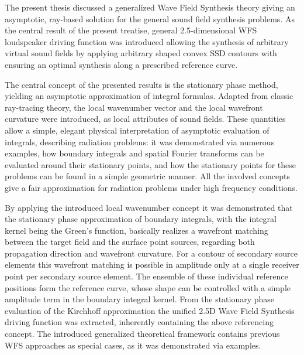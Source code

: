 The present thesis discussed a generalized Wave Field Synthesis theory giving an asymptotic, ray-based solution for the general sound field synthesis problems.
As the central result of the present treatise, general 2.5-dimensional WFS loudspeaker driving function was introduced allowing the synthesis of arbitrary virtual sound fields by applying arbitrary shaped convex SSD contours with ensuring an optimal synthesis along a prescribed reference curve.

The central concept of the presented results is the stationary phase method, yielding an asymptotic approximation of integral formulas.
Adapted from classic ray-tracing theory, the local wavenumber vector and the local wavefront curvature were introduced, as local attributes of sound fields.
These quantities allow a simple, elegant physical interpretation of asymptotic evaluation of integrals, describing radiation problems: it was demonstrated via numerous examples, how boundary integrals and spatial Fourier transforms can be evaluated around their stationary points, and how the stationary points for these problems can be found in a simple geometric manner.
All the involved concepts give a fair approximation for radiation problems under high frequency conditions.

By applying the introduced local wavenumber concept it was demonstrated that the stationary phase approximation of boundary integrals, with the integral kernel being the Green's function, basically realizes a wavefront matching between the target field and the surface point sources, regarding both propagation direction and wavefront curvature.
For a contour of secondary source elements this wavefront matching is possible in amplitude only at a single receiver point per secondary source element.
The ensemble of these individual reference positions form the reference curve, whose shape can be controlled with a simple amplitude term in the boundary integral kernel.
From the stationary phase evaluation of the Kirchhoff approximation the unified 2.5D Wave Field Synthesis driving function was extracted, inherently containing the above referencing concept.
The introduced generalized theoretical framework contains previous WFS approaches as special cases, as it was demonstrated via examples.

